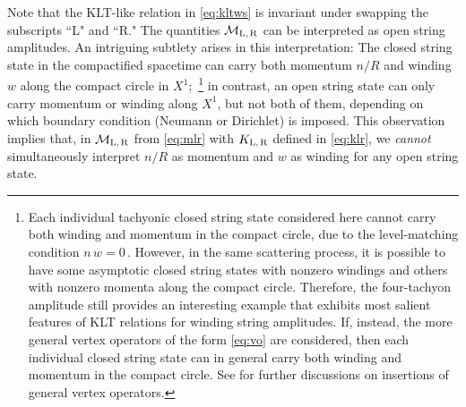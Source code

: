 \documentclass[11pt]{article}
\newcommand{\CM}{\mathcal{M}}
\begin{document}
%
Note that the KLT-like relation in \eqref{eq:kltws} is invariant under swapping the subscripts ``L" and ``R." The quantities $\CM_\text{L,\,R}$ can be interpreted as open string amplitudes. An intriguing subtlety arises in this interpretation: The closed string state in the compactified spacetime can carry both momentum $n/R$ and winding $w$ along the compact circle in $X^1$;~\footnote{Each individual tachyonic closed string state considered here cannot carry both winding and momentum in the compact circle, due to the level-matching condition $n \, w = 0$\,. However, in the same scattering process, it is possible to have some asymptotic closed string states with nonzero windings and others with nonzero momenta along the compact circle. Therefore, the four-tachyon amplitude still provides an interesting example that exhibits most salient features of KLT relations for winding string amplitudes. If, instead, the more general vertex operators of the form \eqref{eq:vo} are considered, then each individual closed string state can in general carry both winding and momentum in the compact circle. See \cite{Gomis:2021ire} for further discussions on insertions of general vertex operators.} in contrast, an open string state can only carry momentum or winding along $X^1$, but not both of them, depending on which boundary condition (Neumann or Dirichlet) is imposed. This observation implies that, in $\CM_\text{L,\,R}$ from \eqref{eq:mlr} with $K_\text{L,\,R}$ defined in \eqref{eq:klr}, we \emph{cannot} simultaneously interpret $n/R$ as momentum and $w$ as winding for any open string state. 
\end{document}
